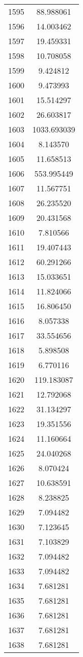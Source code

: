 \documentclass[12pt]{article}
\begin{document}
\begin{longtable}{@{}cc@{}}
1595 & 88.988061 \\
1596 & 14.003462 \\
1597 & 19.459331 \\
1598 & 10.708058 \\
1599 & 9.424812 \\
1600 & 9.473993 \\
1601 & 15.514297 \\
1602 & 26.603817 \\
1603 & 1033.693039 \\
1604 & 8.143570 \\
1605 & 11.658513 \\
1606 & 553.995449 \\
1607 & 11.567751 \\
1608 & 26.235520 \\
1609 & 20.431568 \\
1610 & 7.810566 \\
1611 & 19.407443 \\
1612 & 60.291266 \\
1613 & 15.033651 \\
1614 & 11.824066 \\
1615 & 16.806450 \\
1616 & 8.057338 \\
1617 & 33.554656 \\
1618 & 5.898508 \\
1619 & 6.770116 \\
1620 & 119.183087 \\
1621 & 12.792068 \\
1622 & 31.134297 \\
1623 & 19.351556 \\
1624 & 11.160664 \\
1625 & 24.040268 \\
1626 & 8.070424 \\
1627 & 10.638591 \\
1628 & 8.238825 \\
1629 & 7.094482 \\
1630 & 7.123645 \\
1631 & 7.103829 \\
1632 & 7.094482 \\
1633 & 7.094482 \\
1634 & 7.681281 \\
1635 & 7.681281 \\
1636 & 7.681281 \\
1637 & 7.681281 \\
1638 & 7.681281 \\

\end{longtable}
\end{document}
